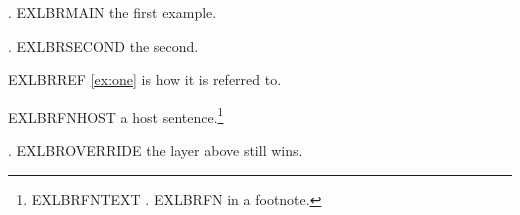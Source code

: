 
\renewcommand{\ExLBr}{[}
\renewcommand{\ExRBr}{]}

\ex.\label{ex:one} EXLBRMAIN the first example.

\ex. EXLBRSECOND the second.

EXLBRREF \ref{ex:one} is how it is referred to.

EXLBRFNHOST a host sentence.\footnote{EXLBRFNTEXT \ex. EXLBRFN in a footnote.}

{\renewcommand{\theExLBr}{[[}\renewcommand{\theExRBr}{]]}%
\ex. EXLBROVERRIDE the layer above still wins.

}

